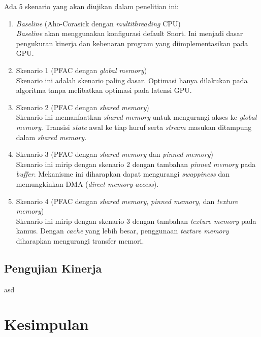 \documentclass[conference]{IEEEtran}
\begin{document}
        Ada 5 skenario yang akan diujikan dalam penelitian ini: 
        \begin{enumerate}
        
            \item \emph{Baseline} (Aho-Corasick dengan \emph{multithreading} CPU) \\
            \emph{Baseline} akan menggunakan konfigurasi default Snort. Ini menjadi dasar pengukuran kinerja dan kebenaran program yang diimplementasikan pada GPU.

            \item Skenario 1 (PFAC dengan \emph{global memory}) \\
            Skenario ini adalah skenario paling dasar. Optimasi hanya dilakukan pada algoritma tanpa melibatkan optimasi pada latensi GPU.

            \item Skenario 2 (PFAC dengan \emph{shared memory}) \\
            Skenario ini memanfaatkan \emph{shared memory} untuk mengurangi akses ke \emph{global memory}. Transisi \emph{state} awal ke tiap huruf serta \emph{stream} masukan ditampung dalam \emph{shared memory}.

            \item Skenario 3 (PFAC dengan \emph{shared memory} dan \emph{pinned memory}) \\
            Skenario ini mirip dengan skenario 2 dengan tambahan \emph{pinned memory} pada \emph{buffer}. Mekanisme ini diharapkan dapat mengurangi \emph{swappiness} dan memungkinkan DMA (\emph{direct memory access}).

            \item Skenario 4 (PFAC dengan \emph{shared memory}, \emph{pinned memory}, dan \emph{texture memory}) \\
            Skenario ini mirip dengan skenario 3 dengan tambahan \emph{texture memory} pada kamus. Dengan \emph{cache} yang lebih besar, penggunaan \emph{texture memory} diharapkan mengurangi transfer memori.

        \end{enumerate}
        
    \subsection{Pengujian Kinerja}
        asd

\section{Kesimpulan}




\end{document}

